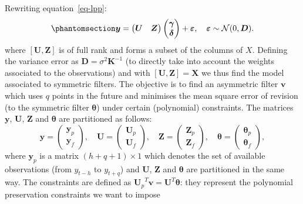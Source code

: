 \documentclass[
]{article}
\newcommand\transp[1]{{#1}^T}
\newcommand\1{\mathds{1}}
\begin{document}
Rewriting equation~\ref{eq-lpp}:
\begin{equation}\phantomsection\label{eq-lpgeneralmodel}{
\boldsymbol y=\begin{pmatrix}\boldsymbol U &\boldsymbol Z\end{pmatrix}
\begin{pmatrix}\boldsymbol \gamma \\ \boldsymbol \delta\end{pmatrix}+\boldsymbol \varepsilon,\quad
\boldsymbol \varepsilon\sim\mathcal{N}(0,\boldsymbol D).
}\end{equation} where \([\boldsymbol U,\boldsymbol Z]\) is of full rank
and forms a subset of the columns of \(X.\) Defining the variance error
as \(\boldsymbol D = \sigma^2\boldsymbol K^{-1}\) (to directly take into
account the weights associated to the observations) and with
\([\boldsymbol U,\boldsymbol Z] = \boldsymbol X\) we thus find the model
associated to symmetric filters. The objective is to find an asymmetric
filter \(\boldsymbol v\) which uses \(q\) points in the future and
minimises the mean square error of revision (to the symmetric filter
\(\boldsymbol \theta\)) under certain (polynomial) constraints. The
matrices \(\boldsymbol y\), \(\boldsymbol U\), \(\boldsymbol Z\) and
\(\boldsymbol \theta\) are partitioned as follows: \[
\boldsymbol y = \begin{pmatrix} \boldsymbol y_p \\ \boldsymbol y_f \end{pmatrix}, \quad
\boldsymbol U = \begin{pmatrix} \boldsymbol U_p \\ \boldsymbol U_f \end{pmatrix}, \quad  
\boldsymbol Z = \begin{pmatrix} \boldsymbol Z_p \\ \boldsymbol Z_f \end{pmatrix}, \quad 
\boldsymbol \theta = \begin{pmatrix} \boldsymbol \theta_p \\ \boldsymbol \theta_f \end{pmatrix},
\] where \(\boldsymbol y_p\) is a matrix \((h+q+1)\times 1\) which
denotes the set of available observations (from \(y_{t-h}\) to
\(y_{t+q}\)) and \(\boldsymbol U\), \(\boldsymbol Z\) and
\(\boldsymbol \theta\) are partitioned in the same way. The constraints
are defined as
\(\transp{\boldsymbol U_p}\boldsymbol v=\transp{\boldsymbol U}\boldsymbol \theta\):
they represent the polynomial preservation constraints we want to impose
\end{document}
